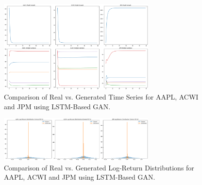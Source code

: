 \documentclass{article}
\begin{document}
\begin{figure}[h!]
    \centering
    \includegraphics[width=0.7\textwidth]{LSTM_gen_samples}
    \caption{Comparison of Real vs. Generated Time Series for AAPL, ACWI and JPM using LSTM-Based GAN.}
    \label{fig:attention_comparison}
\end{figure}

\begin{figure}[h!]
    \centering
    \includegraphics[width=0.7\textwidth]{LSTM_distributions}
    \caption{Comparison of Real vs. Generated Log-Return Distributions for AAPL, ACWI and JPM using LSTM-Based GAN.}
    \label{fig:attention_comparison}
\end{figure}
\end{document}

